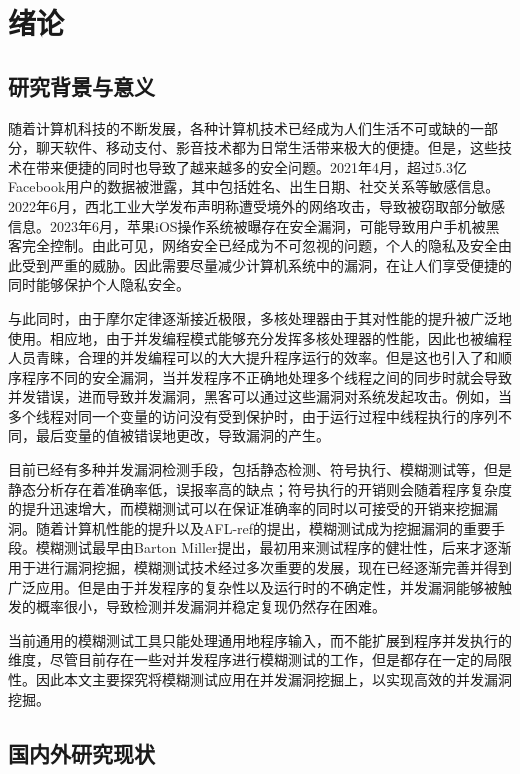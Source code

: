 \cleardoublepage

\section{绪论}

\subsection{研究背景与意义}

随着计算机科技的不断发展，各种计算机技术已经成为人们生活不可或缺的一部分，聊天软件、移动支付、影音技术都为日常生活带来极大的便捷。但是，这些技术在带来便捷的同时也导致了越来越多的安全问题。2021年4月，超过5.3亿Facebook用户的数据被泄露，其中包括姓名、出生日期、社交关系等敏感信息。2022年6月，西北工业大学发布声明称遭受境外的网络攻击，导致被窃取部分敏感信息。2023年6月，苹果iOS操作系统被曝存在安全漏洞，可能导致用户手机被黑客完全控制。由此可见，网络安全已经成为不可忽视的问题，个人的隐私及安全由此受到严重的威胁。因此需要尽量减少计算机系统中的漏洞，在让人们享受便捷的同时能够保护个人隐私安全。

与此同时，由于摩尔定律逐渐接近极限，多核处理器由于其对性能的提升被广泛地使用。相应地，由于并发编程模式能够充分发挥多核处理器的性能，因此也被编程人员青睐，合理的并发编程可以的大大提升程序运行的效率。但是这也引入了和顺序程序不同的安全漏洞，当并发程序不正确地处理多个线程之间的同步时就会导致并发错误，进而导致并发漏洞，黑客可以通过这些漏洞对系统发起攻击。例如，当多个线程对同一个变量的访问没有受到保护时，由于运行过程中线程执行的序列不同，最后变量的值被错误地更改，导致漏洞的产生。

目前已经有多种并发漏洞检测手段，包括静态检测、符号执行、模糊测试等，但是静态分析存在着准确率低，误报率高的缺点；符号执行的开销则会随着程序复杂度的提升迅速增大，而模糊测试可以在保证准确率的同时以可接受的开销来挖掘漏洞。随着计算机性能的提升以及AFL-ref的提出，模糊测试成为挖掘漏洞的重要手段。模糊测试最早由Barton Miller\cite{takanen2018fuzzing}提出，最初用来测试程序的健壮性，后来才逐渐用于进行漏洞挖掘，模糊测试技术经过多次重要的发展，现在已经逐渐完善并得到广泛应用。但是由于并发程序的复杂性以及运行时的不确定性，并发漏洞能够被触发的概率很小，导致检测并发漏洞并稳定复现仍然存在困难。

当前通用的模糊测试工具只能处理通用地程序输入，而不能扩展到程序并发执行的维度，尽管目前存在一些对并发程序进行模糊测试的工作，但是都存在一定的局限性。因此本文主要探究将模糊测试应用在并发漏洞挖掘上，以实现高效的并发漏洞挖掘。


\subsection{国内外研究现状}

